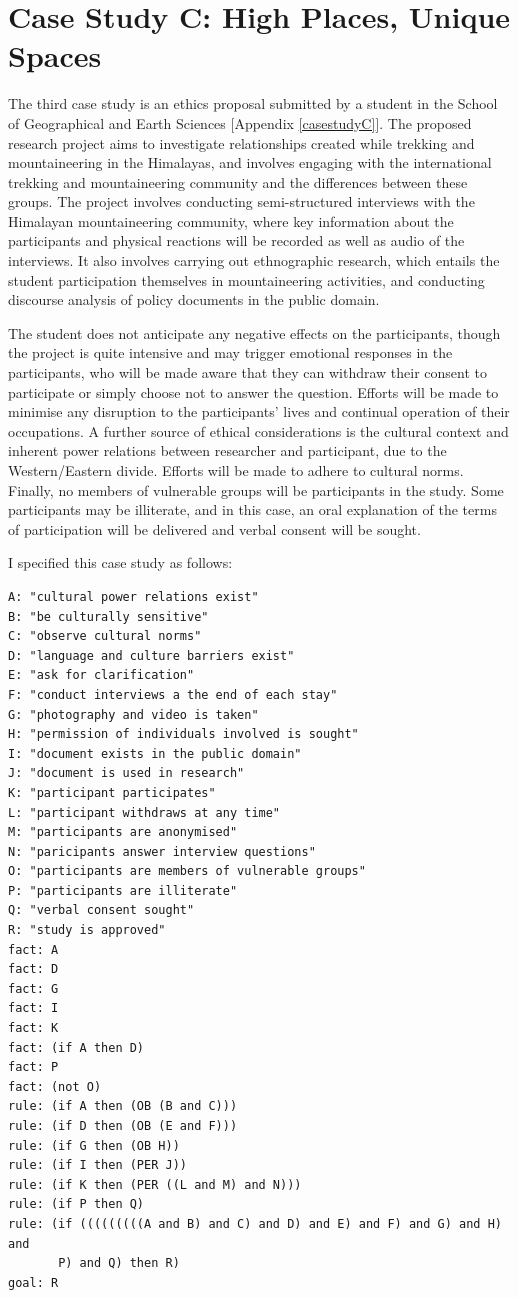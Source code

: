 \documentclass{l4proj}
\begin{document}
\section{Case Study C: High Places, Unique Spaces}
The third case study is an ethics proposal submitted by a student in the School of Geographical and Earth Sciences [Appendix \ref{casestudyC}]. The proposed research project aims to investigate relationships created while trekking and mountaineering in the Himalayas, and involves engaging with the international trekking and mountaineering community and the differences between these groups. The project involves conducting semi-structured interviews with the Himalayan mountaineering community, where key information about the participants and physical reactions will be recorded as well as audio of the interviews. It also involves carrying out ethnographic research, which entails the student participation themselves in mountaineering activities, and conducting discourse analysis of policy documents in the public domain. 

The student does not anticipate any negative effects on the participants, though the project is quite intensive and may trigger emotional responses in the participants, who will be made aware that they can withdraw their consent to participate or simply choose not to answer the question. Efforts will be made to minimise any disruption to the participants' lives and continual operation of their occupations. A further source of ethical considerations is the cultural context and inherent power relations between researcher and participant, due to the Western/Eastern divide. Efforts will be made to adhere to cultural norms. Finally, no members of vulnerable groups will be participants in the study. Some participants may be illiterate, and in this case, an oral explanation of the terms of participation will be delivered and verbal consent will be sought. 

I specified this case study as follows: 
\begin{verbatim}
A: "cultural power relations exist"
B: "be culturally sensitive"
C: "observe cultural norms"
D: "language and culture barriers exist"
E: "ask for clarification"
F: "conduct interviews a the end of each stay"
G: "photography and video is taken"
H: "permission of individuals involved is sought"
I: "document exists in the public domain"
J: "document is used in research"
K: "participant participates"
L: "participant withdraws at any time"
M: "participants are anonymised"
N: "paricipants answer interview questions"
O: "participants are members of vulnerable groups"
P: "participants are illiterate"
Q: "verbal consent sought"
R: "study is approved"
fact: A
fact: D
fact: G
fact: I
fact: K
fact: (if A then D)
fact: P
fact: (not O)
rule: (if A then (OB (B and C)))
rule: (if D then (OB (E and F)))
rule: (if G then (OB H))
rule: (if I then (PER J))
rule: (if K then (PER ((L and M) and N)))
rule: (if P then Q)
rule: (if (((((((((A and B) and C) and D) and E) and F) and G) and H) and 
       P) and Q) then R)
goal: R
\end{verbatim}
\end{document}

